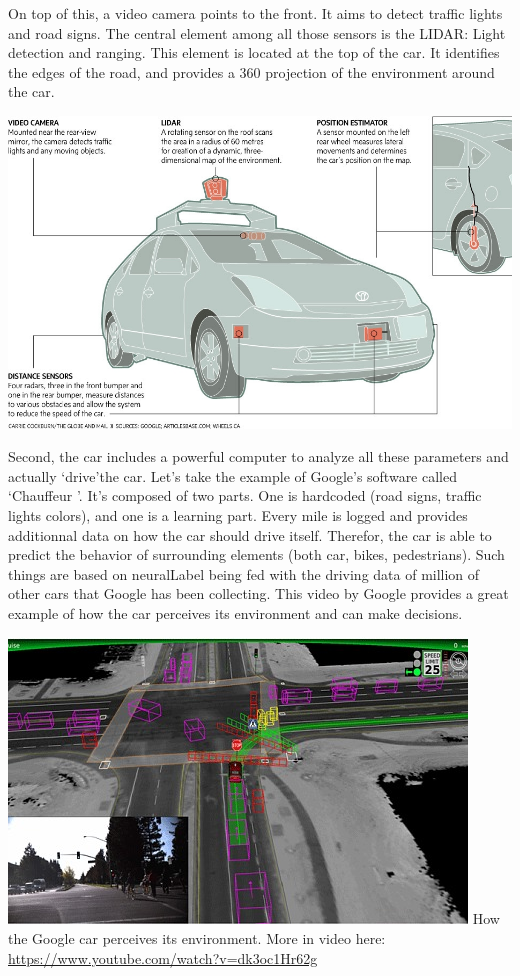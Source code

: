 \documentclass[12pt]{article}
\begin{document}
\noindent On top of this, a video camera points to the front. It aims to detect
traffic lights and road signs. The central element among all those sensors is
the LIDAR: Light detection and ranging. This element is located at the top of
the car. It identifies the edges of the road, and provides a 360 projection of
the environment around the car.

\smallskip
\includegraphics[width=\textwidth]{car-diagram}
\smallskip

Second, the car includes a powerful computer to analyze all these parameters
and actually \lq drive\rq the car. Let's take the example of Google's software
called \lq Chauffeur \rq . It's composed of two parts. One is hardcoded
(road signs, traffic lights colors), and one is a learning part. Every mile is
logged and provides additionnal data on how the car should drive itself.
Therefor, the car is able to predict the behavior of surrounding elements
(both car, bikes, pedestrians). Such things are based on \gls{neuralLabel} being
fed with the driving data of million of other cars
that Google has been collecting. This video by Google provides a great example
of how the car perceives its environment and can make decisions.

\smallskip
\includegraphics[width=\textwidth]{google-car}
How the Google car perceives its environment. More in video here: \url{https://www.youtube.com/watch?v=dk3oc1Hr62g}
\smallskip
\end{document}
